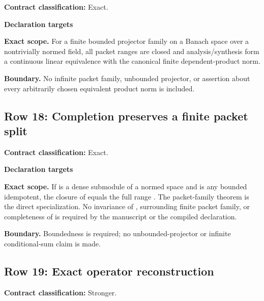 \label{row:17}
\textbf{Contract classification:} Exact.
\par\smallskip\textbf{Declaration targets}\par
{\small\noindent{}\par}
{\small\noindent{}\par}
\medskip\noindent\textbf{Exact scope.} For a finite bounded projector family on a Banach space over a nontrivially normed field, all packet ranges are closed and analysis/synthesis form a continuous linear equivalence with the canonical finite dependent-product norm.
\par\smallskip\noindent\textbf{Boundary.} No infinite packet family, unbounded projector, or assertion about every arbitrarily chosen equivalent product norm is included.
\medskip
{}\subsection{Row 18: Completion preserves a finite packet split}
\label{row:18}
\textbf{Contract classification:} Exact.
\par\smallskip\textbf{Declaration targets}\par
{\small\noindent{}\par}
{\small\noindent{}\par}
\medskip\noindent\textbf{Exact scope.} If  is a dense submodule of a normed space and  is any bounded idempotent, the closure of  equals the full range . The packet-family theorem is the direct specialization. No invariance of , surrounding finite packet family, or completeness of  is required by the manuscript or the compiled declaration.
\par\smallskip\noindent\textbf{Boundary.} Boundedness is required; no unbounded-projector or infinite conditional-sum claim is made.
\medskip
{}\subsection{Row 19: Exact operator reconstruction}
\label{row:19}
\textbf{Contract classification:} Stronger.
